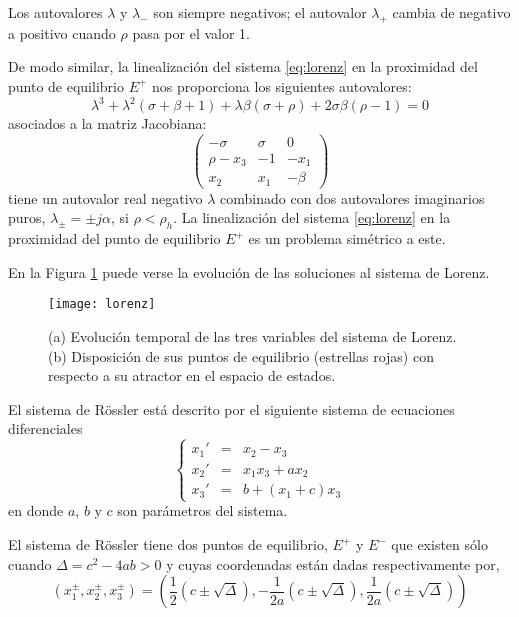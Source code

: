 Los autovalores  $\lambda$ y $\lambda_-$ son siempre negativos; el autovalor $\lambda_+$ cambia de negativo a positivo cuando $\rho$ pasa por el valor 1.

De modo similar, la linealización del sistema \ref{eq:lorenz} en la proximidad del punto de equilibrio $E^+$ nos proporciona los siguientes autovalores:
\begin{equation}
\lambda^3+\lambda^2(\sigma+\beta+1)+\lambda\beta(\sigma+\rho)+2\sigma\beta(\rho-1)=0 \nonumber
\end{equation}
asociados a la matriz Jacobiana:
\begin{equation}
\begin{pmatrix}
-\sigma &\sigma &0 \\
\rho-x_3 &-1 &-x_1 \\
x_2 &x_1 &-\beta
\end{pmatrix}
\nonumber
\end{equation}
tiene un autovalor real negativo $\lambda$ combinado con dos autovalores imaginarios puros, $\lambda_\pm = \pm j \alpha$, si $\rho < \rho_h$.
La linealización del sistema \ref{eq:lorenz} en la proximidad del punto de equilibrio $E^+$ es un problema simétrico a este.

En la Figura \ref{fig:lorenz} puede verse la evolución de las soluciones al sistema de Lorenz.
%
\begin{figure}
\centering\texttt{[image: lorenz]}
\caption{(a) Evolución temporal de las tres variables del sistema de Lorenz.(b) Disposición de sus puntos de equilibrio (estrellas rojas) con respecto a su atractor en el espacio de estados.}
\label{fig:lorenz}
\end{figure}

El sistema de Rössler está descrito por el siguiente sistema de ecuaciones diferenciales
\begin{equation}\label{eq:rossler}
\left \{
\begin{array}{rcl}
x_1' &=& x_2-x_3\\
x_2' &=& x_1x_3+ax_2\\
x_3' &=& b+(x_1+c)x_3
\end{array}
\right.
\end{equation}
en donde $a$, $b$ y $c$ son parámetros del sistema.

El sistema de Rössler tiene dos puntos de equilibrio, $E^+$ y $E^-$ que existen sólo cuando $\Delta = c^2-4ab > 0$ y cuyas coordenadas están dadas respectivamente por,
\begin{equation}
(x_1^\pm,x_2^\pm,x_3^\pm)=\left( \frac{1}{2} (c \pm \sqrt{\Delta}),-\frac{1}{2a} (c \pm \sqrt{\Delta}),\frac{1}{2a} (c \pm \sqrt{\Delta})\right) \nonumber
\end{equation}
 

